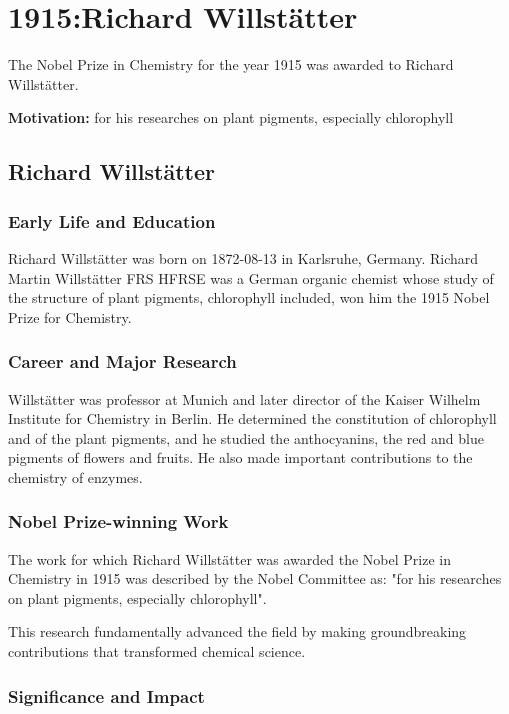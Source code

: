 \chapter{1915:Richard Willstätter}
\label{chap:chemistry1915}

The Nobel Prize in Chemistry for the year 1915 was awarded to Richard Willstätter.

\textbf{Motivation:}
for his researches on plant pigments, especially chlorophyll

\section{Richard Willstätter}

\subsection*{Early Life and Education}

Richard Willstätter was born on 1872-08-13 in Karlsruhe, Germany.
Richard Martin Willstätter FRS HFRSE was a German organic chemist whose study of the structure of plant pigments, chlorophyll included, won him the 1915 Nobel Prize for Chemistry.

\subsection*{Career and Major Research}

Willstätter was professor at Munich and later director of the Kaiser Wilhelm Institute for Chemistry in Berlin. He determined the constitution of chlorophyll and of the plant pigments, and he studied the anthocyanins, the red and blue pigments of flowers and fruits. He also made important contributions to the chemistry of enzymes.

\subsection*{Nobel Prize-winning Work}

The work for which Richard Willstätter was awarded the Nobel Prize in Chemistry in 1915 was described by the Nobel Committee as: "for his researches on plant pigments, especially chlorophyll".

This research fundamentally advanced the field by making groundbreaking contributions that transformed chemical science.

\subsection*{Significance and Impact}

